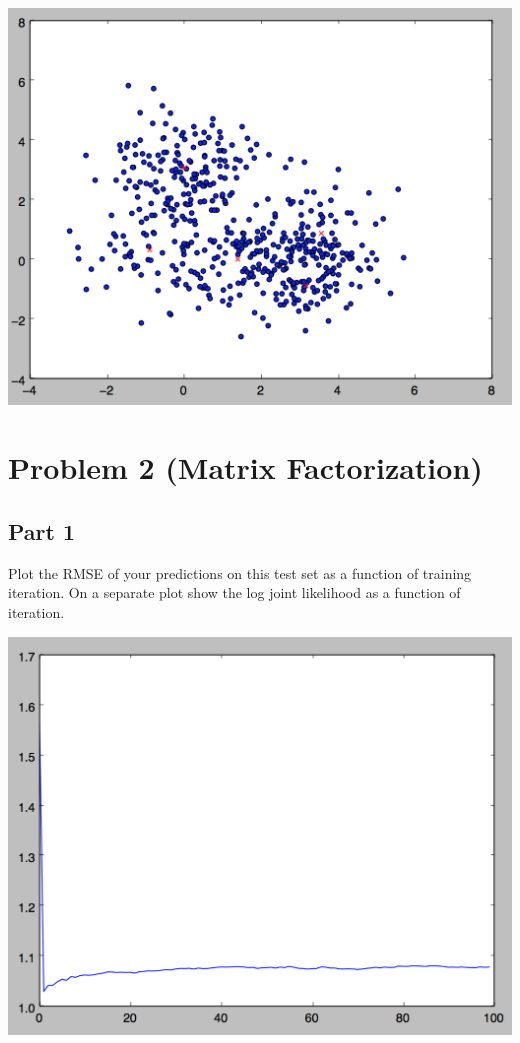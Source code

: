 \documentclass[11pt]{article}
\begin{document}
\includegraphics[scale=.6]{images/k5}

\section*{Problem 2 (Matrix Factorization)}

\subsection*{Part 1}

Plot the RMSE of your predictions on this test set as a function of training iteration. On a separate plot show the log joint likelihood as a function of iteration.

\includegraphics[scale=.7]{images/rmse}
\end{document}
